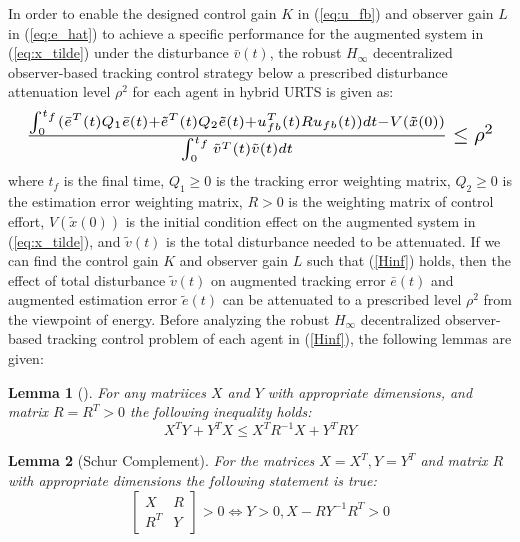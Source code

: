 \documentclass{ieeeaccess}
\newtheorem{lemma}{Lemma}
\begin{document}
In order to enable the designed control gain $K$ in (\ref{eq:u_fb}) and observer gain $L$ in (\ref{eq:e_hat}) to achieve a specific performance for the augmented system in (\ref{eq:x_tilde}) under the disturbance $\bar{v}(t)$, the robust $H_\infty$ decentralized observer-based tracking control strategy below a prescribed disturbance attenuation level $\rho^2$ for each agent in hybrid URTS is given as:
\begin{equation} \label{Hinf}
    \resizebox{1\hsize}{!}{    
        $\frac{\int_{0}^{t_f}(\bar{e}^T(t)Q_1\bar{e}(t) + \tilde{e}^T(t)Q_2\tilde{e}(t) + u_{fb}^T(t)Ru_{fb}(t))dt - V(\tilde{x}(0))}{\int_{0}^{t_f}\tilde{v}^T(t)\tilde{v}(t)dt}\leq \rho^2$
    }
\end{equation}
where $t_f$ is the final time, $Q_1 \geq 0$ is the tracking error weighting matrix, $Q_2 \geq 0$ is the estimation error weighting matrix, $R > 0$ is the weighting matrix of control effort, $V(\tilde{x}(0))$ is the initial condition effect on the augmented system in (\ref{eq:x_tilde}), and $\tilde{v}(t)$ is the total disturbance needed to be attenuated. If we can find the control gain $K$ and observer gain $L$ such that (\ref{Hinf}) holds, then the effect of total disturbance $\tilde{v}(t)$ on augmented tracking error $\bar{e}(t)$ and augmented estimation error $\tilde{e}(t)$ can be attenuated to a prescribed level $\rho^2$ from the viewpoint of energy. Before analyzing the robust $H_\infty$ decentralized observer-based tracking control problem of each agent in (\ref{Hinf}), the following lemmas are given:
\begin{lemma}[\cite{boyd1994linear}] \label{lemma1}
    For any matriices $X$ and $Y$ with appropriate dimensions, and matrix $R=R^T>0$ the following inequality holds:
    \begin{equation} \label{}
        X^T Y + Y^T X \leq X^T R^{-1}X + Y^T R Y
    \end{equation}  
\end{lemma}
\begin{lemma}[Schur Complement\cite{boyd1994linear}] \label{lemma2}
    For the matrices $X=X^T,Y=Y^T$ and matrix $R$ with appropriate dimensions the following statement is true:
    \begin{equation} \label{}
        \begin{bmatrix}
            X & R \\ R^T & Y 
        \end{bmatrix} > 0 \Leftrightarrow Y>0, X-RY^{-1}R^T>0
    \end{equation}
\end{lemma}
\end{document}
